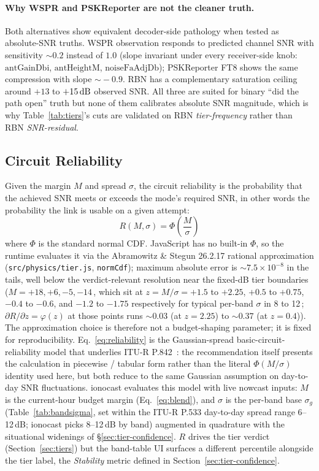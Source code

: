 \documentclass[11pt,a4paper]{article}
\newcommand{\si}[1]{\text{#1}}
\newcommand{\dB}{\text{dB}}
\begin{document}
\paragraph{Why WSPR and PSKReporter are not the cleaner truth.}
Both alternatives show equivalent decoder-side pathology when
tested as absolute-SNR truths.  WSPR observation responds to
predicted channel SNR with sensitivity ${\sim}\!0.2$ instead of
$1.0$ (slope invariant under every receiver-side knob:
$\text{antGainDbi}$, $\text{antHeightM}$, $\text{noiseFaAdjDb}$);
PSKReporter FT8 shows the same compression with slope
${\sim}\!-0.9$.  RBN has a complementary saturation ceiling
around $+13$ to $+15\,\si{\dB}$ observed SNR.  All three are
suited for binary ``did the path open'' truth but none of them
calibrates absolute SNR magnitude, which is why
Table~\ref{tab:tiers}'s cuts are validated on RBN
\emph{tier-frequency} rather than RBN \emph{SNR-residual}.

\subsection{Circuit Reliability}\label{sec:reliability}

Given the margin $M$ and spread $\sigma$, the circuit reliability is
the probability that the achieved SNR meets or exceeds the mode's
required SNR, in other words the probability the link is usable on
a given attempt:
\begin{equation}\label{eq:reliability}
  R(M, \sigma) = \Phi\!\left(\frac{M}{\sigma}\right)
\end{equation}
where $\Phi$ is the standard normal CDF.  JavaScript has no built-in
$\Phi$, so the runtime evaluates it via the Abramowitz \& Stegun
26.2.17 rational approximation (\texttt{src/physics/tier.js},
\texttt{normCdf}); maximum absolute error is ${\sim}\!7.5\times 10^{-8}$
in the tails, well below the verdict-relevant resolution near the
fixed-dB tier boundaries ($M = +18, +6, -5, -14$\,\si{\dB}, which
sit at $z = M/\sigma = +1.5$ to $+2.25$, $+0.5$ to $+0.75$, $-0.4$
to $-0.6$, and $-1.2$ to $-1.75$ respectively for typical per-band
$\sigma$ in 8 to 12\,\si{\dB}; $\partial R/\partial z = \varphi(z)$
at those points runs ${\sim}0.03$ (at $z = 2.25$) to
${\sim}0.37$ (at $z = 0.4$)).  The approximation choice is
therefore not a budget-shaping parameter; it is fixed for
reproducibility.
Eq.~\ref{eq:reliability} is the Gaussian-spread basic-circuit-
reliability model that underlies ITU-R P.842~\cite{itup842}: the
recommendation itself presents the calculation in piecewise /
tabular form rather than the literal $\Phi(M/\sigma)$ identity
used here, but both reduce to the same Gaussian assumption on
day-to-day SNR fluctuations.  ionocast evaluates this model with
live nowcast inputs: $M$ is the current-hour budget margin
(Eq.~\ref{eq:blend}), and $\sigma$ is the per-band base $\sigma_g$
(Table~\ref{tab:bandsigma}, set within the ITU-R P.533 day-to-day
spread range 6--12\,dB; ionocast picks 8--12\,dB by band)
augmented in quadrature with the situational widenings of
\S\ref{sec:tier-confidence}.  $R$ drives
the tier verdict (Section~\ref{sec:tiers}) but the band-table UI
surfaces a different percentile alongside the tier label, the
\emph{Stability} metric defined in Section~\ref{sec:tier-confidence}.
\end{document}
